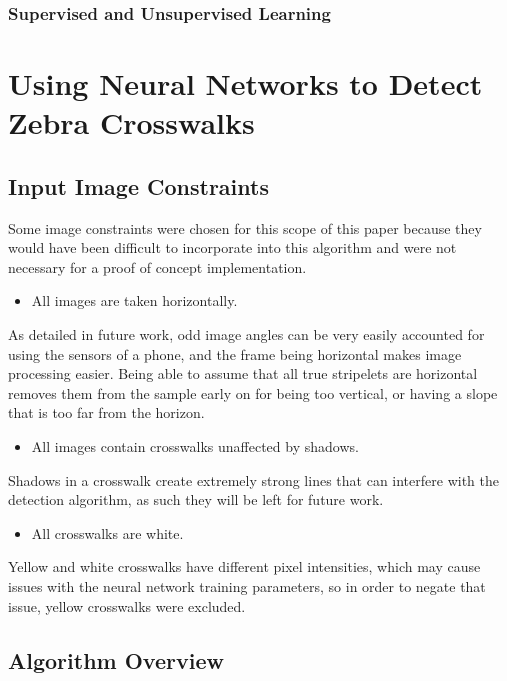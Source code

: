 \documentclass[12pt]{ucthesis}
\begin{document}
\subsection{Supervised and Unsupervised Learning}

\chapter{Using Neural Networks to Detect Zebra Crosswalks}

\section{Input Image Constraints}
\label{Input Image Constraints}

Some image constraints were chosen for this scope of this paper because they would have been difficult to incorporate into this algorithm and were not necessary for a proof of concept implementation.

\begin{itemize}
\item All images are taken horizontally.
\end{itemize}

As detailed in future work, odd image angles can be very easily accounted for using the sensors of a phone, and the frame being horizontal makes image processing easier. Being able to assume that all true stripelets are horizontal removes them from the sample early on for being too vertical, or having a slope that is too far from the horizon. 

\begin{itemize}
\item All images contain crosswalks unaffected by shadows.
\end{itemize}

Shadows in a crosswalk create extremely strong lines that can interfere with the detection algorithm, as such they will be left for future work. 

\begin{itemize}
\item All crosswalks are white.
\end{itemize}

Yellow and white crosswalks have different pixel intensities, which may cause issues with the neural network training parameters, so in order to negate that issue, yellow crosswalks were excluded. 

\section{Algorithm Overview}
\label{Algorithm Overview}
\end{document}
